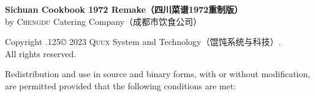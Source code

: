 %
%
%
%
%
%
%
\begingroup%

\footnotesize%
\singlespacing%
\setlength{\parindent}{0pt}%
\setlength{\parskip}{.375\baselineskip}%
{\sffamily\bfseries Sichuan Cookbook 1972 Remake\!（四川菜谱1972重制版）}\\%
by \textsc{Chengdu} Catering Company\!（成都市饮食公司）

\vspace{.75\baselineskip}

Copyright {\lower.125\baselineskip\hbox{\copyright}} 2023
\textsc{Quux} System and Technology\!（馄饨系统与科技）\!\!\!.\\%
All rights reserved.

Redistribution and use in source and binary forms, with or without
modification, are permitted provided that the following conditions are met:

